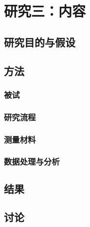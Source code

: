 \chapter{研究三：内容}
\section{研究目的与假设}

\section{方法}

\subsection{被试}

\subsection{研究流程}


\subsection{测量材料}


\subsection{数据处理与分析}


\section{结果}

\section{讨论}
